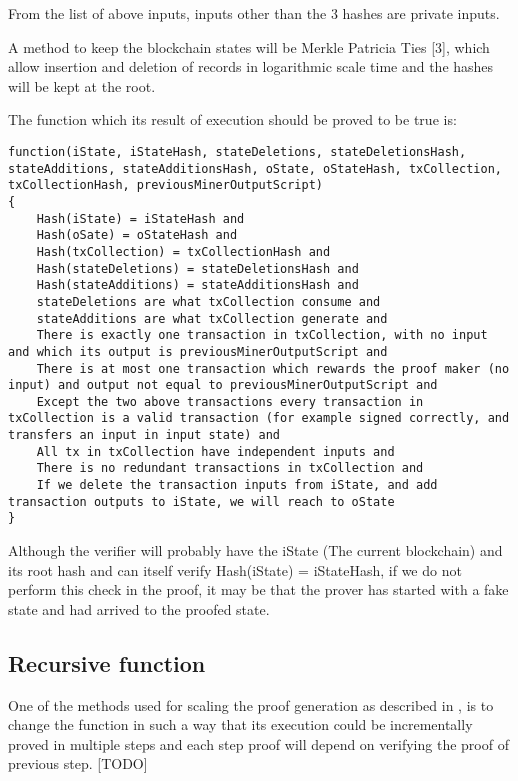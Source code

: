 \documentclass{article}
\begin{document}
From the list of above inputs, inputs other than the 3 hashes are private inputs.

A method to keep the blockchain states will be Merkle Patricia Ties [3], which allow insertion and deletion of records in logarithmic scale time and the hashes will be kept at the root.

The function which its result of execution should be proved to be true is:

\begin{lstlisting}
function(iState, iStateHash, stateDeletions, stateDeletionsHash, stateAdditions, stateAdditionsHash, oState, oStateHash, txCollection, txCollectionHash, previousMinerOutputScript)
{
	Hash(iState) = iStateHash and
	Hash(oSate) = oStateHash and
	Hash(txCollection) = txCollectionHash and
	Hash(stateDeletions) = stateDeletionsHash and
	Hash(stateAdditions) = stateAdditionsHash and 
	stateDeletions are what txCollection consume and
	stateAdditions are what txCollection generate and
	There is exactly one transaction in txCollection, with no input and which its output is previousMinerOutputScript and 
	There is at most one transaction which rewards the proof maker (no input) and output not equal to previousMinerOutputScript and
	Except the two above transactions every transaction in txCollection is a valid transaction (for example signed correctly, and transfers an input in input state) and
	All tx in txCollection have independent inputs and
	There is no redundant transactions in txCollection and
	If we delete the transaction inputs from iState, and add transaction outputs to iState, we will reach to oState
}
\end{lstlisting}

Although the verifier will probably have the iState (The current blockchain) and its root hash and can itself verify Hash(iState) = iStateHash, if we do not perform this check in the proof, it may be that the prover has started with a fake state and had arrived to the proofed state.

\subsection{Recursive function}

One of the methods used for scaling the proof generation as described in \cite{scalableZKSNARK}, is to change the function in such a way that its execution could be incrementally proved in multiple steps and each step proof will depend on verifying the proof of previous step.
[TODO]
\end{document}

